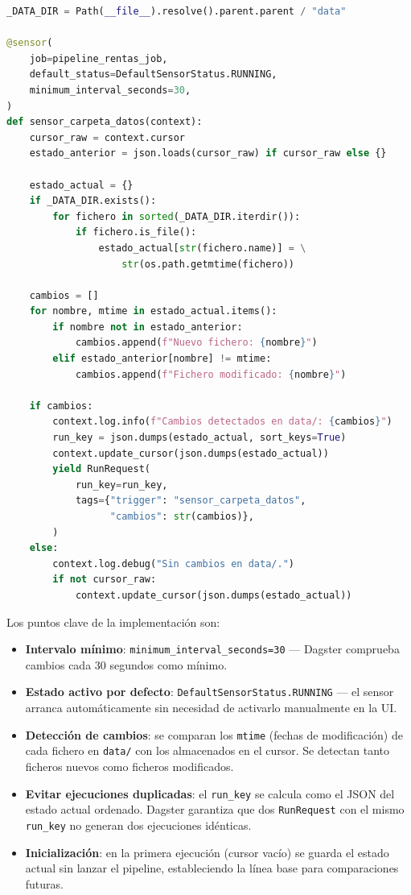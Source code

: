 \documentclass[11pt]{report}
\begin{document}
\begin{lstlisting}[style=mystyle, language=Python, caption={Sensor de vigilancia de la carpeta data/}]
_DATA_DIR = Path(__file__).resolve().parent.parent / "data"

@sensor(
    job=pipeline_rentas_job,
    default_status=DefaultSensorStatus.RUNNING,
    minimum_interval_seconds=30,
)
def sensor_carpeta_datos(context):
    cursor_raw = context.cursor
    estado_anterior = json.loads(cursor_raw) if cursor_raw else {}

    estado_actual = {}
    if _DATA_DIR.exists():
        for fichero in sorted(_DATA_DIR.iterdir()):
            if fichero.is_file():
                estado_actual[str(fichero.name)] = \
                    str(os.path.getmtime(fichero))

    cambios = []
    for nombre, mtime in estado_actual.items():
        if nombre not in estado_anterior:
            cambios.append(f"Nuevo fichero: {nombre}")
        elif estado_anterior[nombre] != mtime:
            cambios.append(f"Fichero modificado: {nombre}")

    if cambios:
        context.log.info(f"Cambios detectados en data/: {cambios}")
        run_key = json.dumps(estado_actual, sort_keys=True)
        context.update_cursor(json.dumps(estado_actual))
        yield RunRequest(
            run_key=run_key,
            tags={"trigger": "sensor_carpeta_datos",
                  "cambios": str(cambios)},
        )
    else:
        context.log.debug("Sin cambios en data/.")
        if not cursor_raw:
            context.update_cursor(json.dumps(estado_actual))
\end{lstlisting}

Los puntos clave de la implementación son:

\begin{itemize}
  \item \textbf{Intervalo mínimo}: \texttt{minimum\_interval\_seconds=30} — Dagster comprueba
        cambios cada 30 segundos como mínimo.
  \item \textbf{Estado activo por defecto}: \texttt{DefaultSensorStatus.RUNNING} — el sensor
        arranca automáticamente sin necesidad de activarlo manualmente en la UI.
  \item \textbf{Detección de cambios}: se comparan los \texttt{mtime} (fechas de modificación)
        de cada fichero en \texttt{data/} con los almacenados en el cursor. Se detectan tanto
        ficheros nuevos como ficheros modificados.
  \item \textbf{Evitar ejecuciones duplicadas}: el \texttt{run\_key} se calcula como el JSON
        del estado actual ordenado. Dagster garantiza que dos \texttt{RunRequest} con el mismo
        \texttt{run\_key} no generan dos ejecuciones idénticas.
  \item \textbf{Inicialización}: en la primera ejecución (cursor vacío) se guarda el estado
        actual sin lanzar el pipeline, estableciendo la línea base para comparaciones futuras.
\end{itemize}
\end{document}
